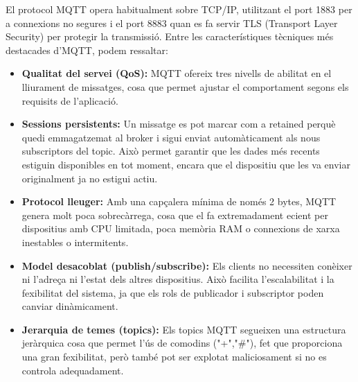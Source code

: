   El protocol MQTT opera habitualment sobre TCP/IP, utilitzant el port 1883 per a connexions no segures i el port 8883 quan es fa servir TLS (Transport Layer Security) per protegir la transmissió. Entre les característiques tècniques més destacades d’MQTT, podem ressaltar: 
  
  \begin{itemize}
      \item \textbf{Qualitat del servei (QoS):} MQTT ofereix tres nivells de abilitat en el lliurament de missatges, cosa que permet ajustar el comportament segons els requisits de l’aplicació. 
      \item \textbf{Sessions persistents:} Un missatge es pot marcar com a retained perquè quedi emmagatzemat al broker i sigui enviat automàticament als nous subscriptors del topic. Això permet garantir que les dades més recents estiguin disponibles en tot moment, encara que el dispositiu que les va enviar originalment ja no estigui actiu. 
      \item \textbf{Protocol lleuger:} Amb una capçalera mínima de només 2 bytes, MQTT genera molt poca sobrecàrrega, cosa que el fa extremadament ecient per dispositius amb CPU limitada, poca memòria RAM o connexions de xarxa inestables o intermitents.
      \item \textbf{Model desacoblat (publish/subscribe):} Els clients no necessiten conèixer ni l’adreça ni l’estat dels altres dispositius. Això facilita l’escalabilitat i la fexibilitat del sistema, ja que els rols de publicador i subscriptor poden canviar dinàmicament. 
      \item \textbf{Jerarquia de temes (topics):} Els topics MQTT segueixen una estructura jeràrquica cosa que permet l’ús de comodins ("+","\#"), fet que proporciona una gran fexibilitat, però també pot ser explotat maliciosament si no es controla adequadament. 
  \end{itemize}

